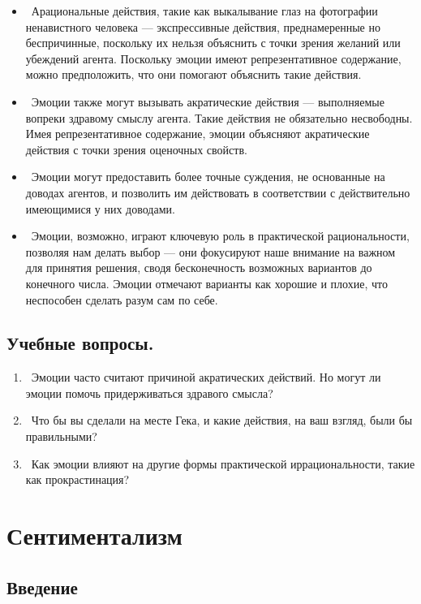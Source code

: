 \documentclass[11pt]{book}
\begin{document}
\begin{itemize}
  \item\ Арациональные действия, такие как выкалывание глаз на фотографии ненавистного человека --- экспрессивные действия, преднамеренные но беспричинные, поскольку их нельзя объяснить с точки зрения желаний или убеждений агента. Поскольку эмоции имеют репрезентативное содержание, можно предположить, что они помогают объяснить такие действия.
  \item\ Эмоции также могут вызывать акратические действия --- выполняемые вопреки здравому смыслу агента. Такие действия не обязательно несвободны. Имея репрезентативное содержание, эмоции объясняют акратические действия с точки зрения оценочных свойств.
  \item\ Эмоции могут предоставить более точные суждения, не основанные на доводах агентов, и позволить им действовать в соответствии с действительно имеющимися у них доводами.
  \item\ Эмоции, возможно, играют ключевую роль в практической рациональности, позволяя нам делать выбор --- они фокусируют наше внимание на важном для принятия решения, сводя бесконечность возможных вариантов до конечного числа. Эмоции отмечают варианты как хорошие и плохие, что неспособен сделать разум сам по себе.
\end{itemize}

\begin{tcolorbox}
  \section{Учебные вопросы.}
  \begin{enumerate}
    \item\ Эмоции часто считают причиной акратических действий. Но могут ли эмоции помочь придерживаться здравого смысла?
    \item\ Что бы вы сделали на месте Гека, и какие действия, на ваш взгляд, были бы правильными?
    \item\ Как эмоции влияют на другие формы практической иррациональности, такие как прокрастинация?
  \end{enumerate}
\end{tcolorbox}

\chapter{Сентиментализм}

\section{Введение}
\end{document}
